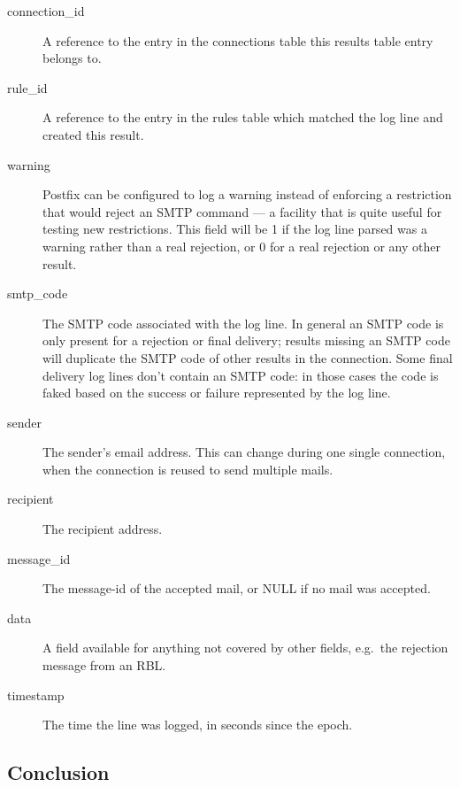 \documentclass[a4paper,12pt,draft]{article}
\begin{document}
\begin{description}

    \item [connection\_id] A reference to the entry in the connections
        table this results table entry belongs to.

    \item [rule\_id] A reference to the entry in the rules table which
        matched the log line and created this result.

    \item [warning] Postfix can be configured to log a warning instead of
        enforcing a restriction that would reject an SMTP command --- a
        facility that is quite useful for testing new restrictions.  This
        field will be 1 if the log line parsed was a warning rather than a
        real rejection, or 0 for a real rejection or any other result.

    \item [smtp\_code] The SMTP code associated with the log line.  In
        general an SMTP code is only present for a rejection or final
        delivery; results missing an SMTP code will duplicate the SMTP code
        of other results in the connection.  Some final delivery log lines
        don't contain an SMTP code: in those cases the code is faked based
        on the success or failure represented by the log line.

    \item [sender] The sender's email address.  This can change during one
        single connection, when the connection is reused to send multiple
        mails.

    \item [recipient] The recipient address.

    \item [message\_id] The message-id of the accepted mail, or NULL if no
        mail was accepted.

    \item [data] A field available for anything not covered by other
        fields, e.g.\ the rejection message from an RBL\@.

    \item [timestamp] The time the line was logged, in seconds since the
        epoch.

\end{description}

\subsection{Conclusion}
\end{document}
